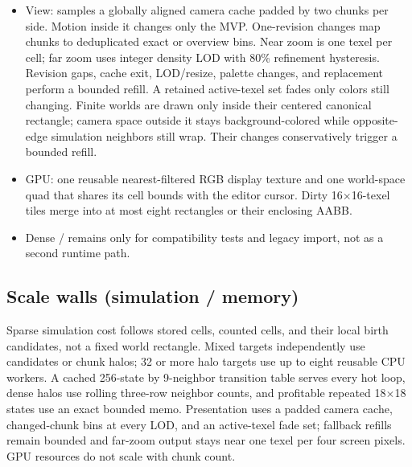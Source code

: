 \begin{itemize}
        mutates the spare grid while the main thread reads the published grid.
        A completion publishes at a frame boundary. Incremental completions
        carry changed chunk snapshots and update the former display grid before
        it becomes the next worker buffer. Broad completions carry only a
        replacement marker; the spare advances directly from the immutable
        published grid and updates its own nodes in place. Incremental catch-up uses the grid's retained
        changed addresses and skips states superseded by the incoming delta;
        Only one request may be outstanding. Status separates rolling mirror,
        advance, and capture latency.
  \item View:  samples a globally aligned camera cache
        padded by two chunks per side. Motion inside it changes only the MVP.
        One-revision changes map chunks to deduplicated exact or overview bins.
        Near zoom is one texel per cell; far zoom uses integer density LOD with
        80\% refinement hysteresis. Revision gaps, cache exit, LOD/resize,
        palette changes, and replacement perform a bounded refill. A retained
        active-texel set fades only colors still changing. Finite worlds are
        drawn only inside their centered canonical rectangle; camera space
        outside it stays background-colored while opposite-edge simulation
        neighbors still wrap. Their changes conservatively trigger a bounded
        refill.
  \item GPU: one reusable nearest-filtered RGB display texture and one
        world-space  quad that shares its cell bounds
        with the editor cursor. Dirty 16$\times$16-texel tiles merge into at
        most eight rectangles or their enclosing AABB.
  \item Dense / remains only for
        compatibility tests and legacy import, not as a second runtime path.
\end{itemize}

\subsection{Scale walls (simulation / memory)}
\begin{statusbox}
Sparse simulation cost follows stored cells, counted cells, and their local
birth candidates, not a fixed world rectangle. Mixed targets independently use
candidates or chunk halos; 32 or more halo targets use up to eight reusable CPU
workers. A cached 256-state by 9-neighbor transition table serves every hot
loop, dense halos use rolling three-row neighbor counts, and profitable
repeated 18$\times$18 states use an exact bounded memo. Presentation uses
a padded camera cache, changed-chunk bins at every LOD, and an active-texel fade
set; fallback refills remain bounded and far-zoom output stays near one texel
per four screen pixels. GPU
resources do not scale with chunk count.
\end{statusbox}

